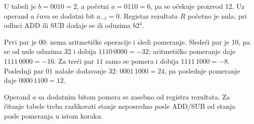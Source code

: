 U tabeli je $b=0010=2$, a početni $a=0110=6$, pa se očekuje proizvod 12. Uz operand $a$ čuva se dodatni bit $a_{-1}=0$. Registar rezultata $R$ početno je nula; pri odluci ADD ili SUB dodaje se ili oduzima $b2^4$.

Prvi par je $00$: nema aritmetičke operacije i sledi pomeranje. Sledeći par je $10$, pa se od nule oduzima 32 i dobija $1110\,0000=-32$; aritmetičko pomeranje daje $1111\,0000=-16$. Za treći par $11$ samo se pomera i dobija $1111\,1000=-8$. Poslednji par $01$ nalaže dodavanje 32: $0001\,1000=24$, pa poslednje pomeranje daje $0000\,1100=12$.

Operand $a$ sa dodatnim bitom pomera se zasebno od registra rezultata. Za čitanje tabele treba razlikovati stanje neposredno posle ADD/SUB od stanja posle pomeranja u istom koraku.
